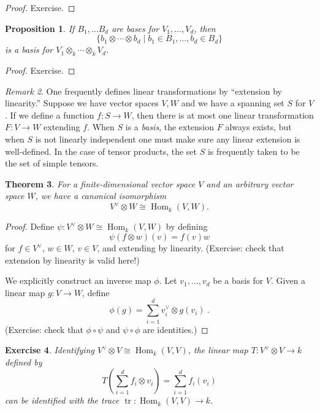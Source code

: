 \documentclass[12pt]{article}
\theoremstyle{plain}
\newtheorem{theorem}{Theorem}[section]
\newtheorem{proposition}[theorem]{Proposition}
\newtheorem{exercise}[theorem]{Exercise}
\theoremstyle{definition}
\theoremstyle{remark}
\newtheorem{remark}[theorem]{Remark}
\numberwithin{equation}{section}
\begin{document}
\begin{proof}
Exercise.
\end{proof}

\begin{proposition}
If $B_1,\ldots B_d$ are bases for $V_1,\ldots,V_d$, then
\[
\{ b_1 \otimes \cdots \otimes b_d \mid b_1 \in B_1, \ldots, b_d \in B_d
\}
\]
is a basis for $V_1 \otimes_k \cdots \otimes_k V_d$.
\end{proposition}

\begin{proof}
Exercise.
\end{proof}

\begin{remark}
One frequently defines linear transformations by
``extension by linearity.''
Suppose we have vector spaces $V,W$ and we have a spanning
set $S$ for $V$.  If we define a function $f : S \to W$,
then there is at most one linear transformation $F : V \to W$
extending $f$.  When $S$ is a \emph{basis}, the extension $F$ always exists,
but when $S$ is not linearly independent one must make sure any linear
extension is well-defined.
In the case of tensor products, the set $S$ is frequently taken to be
the set of simple tensors.
\end{remark}

\begin{theorem}
For a finite-dimensional vector space $V$ and an arbitrary vector space
$W$, we have a canonical isomorphism
\[
V^\vee \otimes W \cong \operatorname{Hom}_k(V,W) .
\]
\end{theorem}

\begin{proof}
Define $\psi : V^\vee \otimes W \cong \operatorname{Hom}_k(V,W)$
by defining
\[
\psi(f \otimes w)(v) = f(v)w
\]
for $f \in V^\vee$, $w \in W$, $v \in V$, and extending by linearity.
(Exercise: check that extension by linearity is valid here!)

We explicitly construct an inverse map $\phi$.
Let $v_1,\ldots, v_d$ be a basis for $V$.
Given a linear map $g : V \to W$, define
\[
\phi(g) = \sum_{i=1}^d v^\vee_i \otimes g(v_i) \ .
\]
(Exercise: check that $\phi \circ \psi$ and $\psi \circ \phi$ are
identities.)
\end{proof}

\begin{exercise}
Identifying $V^\vee \otimes V \cong \operatorname{Hom}_k(V,V)$,
the linear map $T: V^\vee \otimes V \to k$ defined by
\[
T\left( \sum_{i=1}^d f_i \otimes v_i\right)
= \sum_{i=1}^d f_i(v_i)
\]
can be identified with the trace $\operatorname{tr} :
\operatorname{Hom}_k(V,V) \to k$.
\end{exercise}
\end{document}
